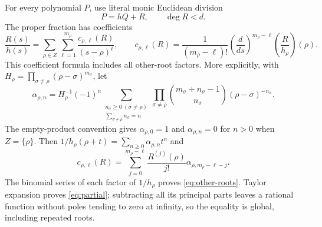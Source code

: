 \documentclass[11pt]{article}
\begin{document}
For every polynomial $P$, use literal monic Euclidean division
\begin{equation}\label{eq:division}
 P=hQ+R,\qquad \deg R<d.
\end{equation}
The proper fraction has coefficients
\begin{equation}\label{eq:partial}
 \frac{R(s)}{h(s)}=
 \sum_{\rho\in Z}\sum_{\ell=1}^{m_\rho}
        \frac{c_{\rho,\ell}(R)}{(s-\rho)^\ell},\qquad
 c_{\rho,\ell}(R)=
 \frac{1}{(m_\rho-\ell)!}
 \left(\frac d{ds}\right)^{m_\rho-\ell}
                  \left(\frac R{h_\rho}\right)(\rho).
\end{equation}
This coefficient formula includes all other-root factors. More
explicitly, with $H_\rho=\prod_{\sigma\ne\rho}
(\rho-\sigma)^{m_\sigma}$, let
\begin{equation}\label{eq:other-roots}
 \alpha_{\rho,n}=H_\rho^{-1}(-1)^n
 \sum_{\substack{n_\sigma\geq0\ (\sigma\ne\rho)\\
                         \sum_{\sigma\ne\rho}n_\sigma=n}}
 \prod_{\sigma\ne\rho}
  \binom{m_\sigma+n_\sigma-1}{n_\sigma}
                    (\rho-\sigma)^{-n_\sigma}.
\end{equation}
The empty-product convention gives $\alpha_{\rho,0}=1$ and
$\alpha_{\rho,n}=0$ for $n>0$ when $Z=\{\rho\}$.
Then $1/h_\rho(\rho+t)=\sum_{n\geq0}\alpha_{\rho,n}t^n$ and
\[
 c_{\rho,\ell}(R)=\sum_{j=0}^{m_\rho-\ell}
       \frac{R^{(j)}(\rho)}{j!}\alpha_{\rho,m_\rho-\ell-j}.
\]
The binomial series of each factor of $1/h_\rho$ proves
\eqref{eq:other-roots}. Taylor expansion proves
\eqref{eq:partial}; subtracting all its principal parts leaves
a rational function without poles tending to zero at infinity,
so the equality is global, including repeated roots.
\end{document}
